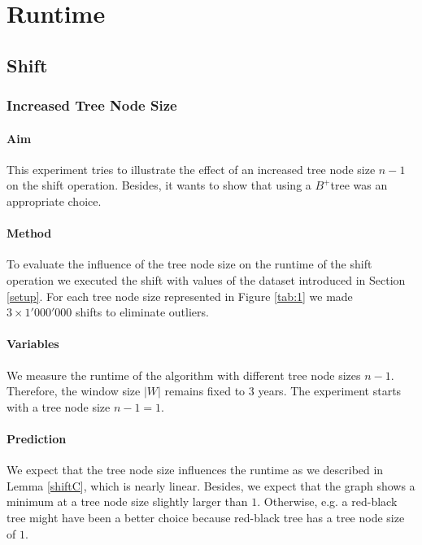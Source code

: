 \documentclass[abstracton,12pt,oneside]{scrreprt}
\begin{document}
\section{Runtime}

\subsection{Shift}

\subsubsection{Increased Tree Node Size}

\paragraph{Aim}

This experiment tries to illustrate the effect of an increased tree node size $n-1$ on the shift operation. Besides, it wants to show that using a $B^+$tree was an appropriate choice.

\paragraph{Method}
To evaluate the influence of the tree node size on the runtime of the shift operation we executed the shift with values of the dataset introduced in Section \ref{setup}. For each tree node size represented in Figure \ref{tab:1} we made $3 \times 1'000'000$ shifts to eliminate outliers.

\paragraph{Variables}
We measure the runtime of the algorithm with different tree node sizes $n-1$. Therefore, the window size $|W|$ remains fixed to 3 years. The experiment starts with a tree node size $n-1 = 1$.

\paragraph{Prediction}
We expect that the tree node size influences the runtime as we described in Lemma \ref{shiftC}, which is nearly linear. Besides, we expect that the graph shows a minimum at a tree node size slightly larger than $1$. Otherwise, e.g. a red-black tree might have been a better choice because red-black tree has a tree node size of $1$\cite{RedBlackTree}.
\end{document}
